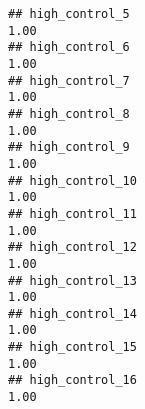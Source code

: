 \documentclass[
]{article}
\begin{document}
\begin{verbatim}
## high_control_5                                                                                                                                                                                                              1.00
## high_control_6                                                                                                                                                                                                              1.00
## high_control_7                                                                                                                                                                                                              1.00
## high_control_8                                                                                                                                                                                                              1.00
## high_control_9                                                                                                                                                                                                              1.00
## high_control_10                                                                                                                                                                                                             1.00
## high_control_11                                                                                                                                                                                                             1.00
## high_control_12                                                                                                                                                                                                             1.00
## high_control_13                                                                                                                                                                                                             1.00
## high_control_14                                                                                                                                                                                                             1.00
## high_control_15                                                                                                                                                                                                             1.00
## high_control_16                                                                                                                                                                                                             1.00

\end{verbatim}
\end{document}
